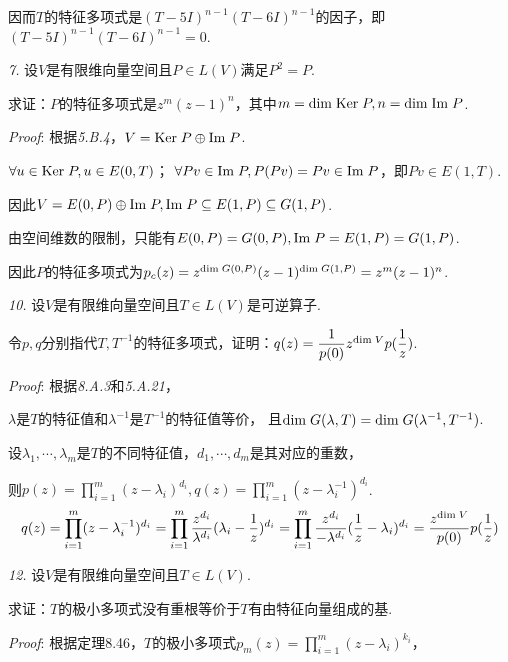 因而\(T\)的特征多项式是\((T-5I)^{n-1}(T-6I)^{n-1}\)的因子，即\((T-5I)^{n-1}(T-6I)^{n-1}=0\).

\hspace*{\fill}

\textit{7.}
设\(V\)是有限维向量空间且\(P \in L(V)\)满足\(P^2=P\).

求证：\(P\)的特征多项式是\(z^m(z-1)^n\)，其中\(m=\mathrm{dim \;} \mathrm{Ker \;} P,n=\mathrm{dim \;} \mathrm{Im \;} P\).

\textit{Proof}:
根据\textit{5.B.4}，\(V=\mathrm{Ker \;} P \oplus \mathrm{Im \;} P\).

\(\forall u \in \mathrm{Ker \;} P,u \in E(0,T)\)；
\(\forall Pv \in \mathrm{Im \;} P,P(Pv)=Pv \in \mathrm{Im \;} P\)，即\(Pv \in E(1,T)\).

因此\(V=E(0,P) \oplus \mathrm{Im \;} P,\mathrm{Im \;} P \subseteq E(1,P) \subseteq G(1,P)\).

由空间维数的限制，只能有\(E(0,P)=G(0,P),\mathrm{Im \;} P=E(1,P)=G(1,P)\).

因此\(P\)的特征多项式为\(p_c(z)=z^{\mathrm{dim \;} G(0,P)}(z-1)^{\mathrm{dim \;} G(1,P)}=z^m(z-1)^n\).

\newpage

\textit{10.}
设\(V\)是有限维向量空间且\(T \in L(V)\)是可逆算子.

令\(p,q\)分别指代\(T,T^{-1}\)的特征多项式，证明：\(q(z)=\dfrac{1}{p(0)}z^{\mathrm{dim \;} V}p(\dfrac{1}{z})\).

\textit{Proof}:
根据\textit{8.A.3}和\textit{5.A.21}，

\(\lambda\)是\(T\)的特征值和\(\lambda^{-1}\)是\(T^{-1}\)的特征值等价，
且\(\mathrm{dim \;} G(\lambda,T)=\mathrm{dim \;} G(\lambda^{-1},T^{-1})\).

设\(\lambda_1,\cdots,\lambda_m\)是\(T\)的不同特征值，\(d_1,\cdots,d_m\)是其对应的重数，

则\(p(z)=\prod_{i=1}^m (z-\lambda_i)^{d_i},q(z)=\prod_{i=1}^m (z-\lambda_i^{-1})^{d_i}\).
    \begin{align*}
        q(z)=\prod_{i=1}^m (z-\lambda_i^{-1})^{d_i}
            =\prod_{i=1}^m \dfrac{z^{d_i}}{\lambda^{d_i}}(\lambda_i-\dfrac{1}{z})^{d_i}
            =\prod_{i=1}^m \dfrac{z^{d_i}}{-\lambda^{d_i}}(\dfrac{1}{z}-\lambda_i)^{d_i}
            =\dfrac{z^{\mathrm{dim \;} V}}{p(0)}p(\dfrac{1}{z})
    \end{align*}

\hspace*{\fill}

\textit{12.}
设\(V\)是有限维向量空间且\(T \in L(V)\).

求证：\(T\)的极小多项式没有重根等价于\(T\)有由特征向量组成的基.

\textit{Proof}:
根据定理8.46，\(T\)的极小多项式\(p_m(z)=\prod_{i=1}^m (z-\lambda_i)^{k_i}\)，

